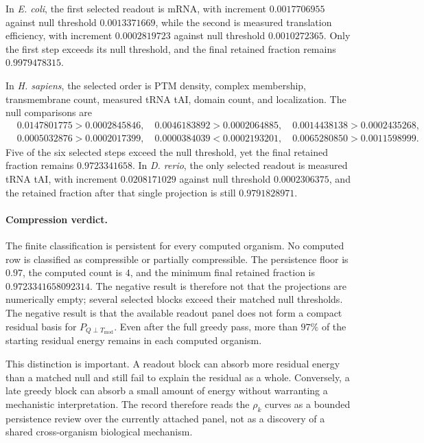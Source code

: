 In \emph{E. coli}, the first selected readout is mRNA, with increment $0.0017706955$ against null threshold $0.0013371669$, while the second is measured translation efficiency, with increment $0.0002819723$ against null threshold $0.0010272365$.  Only the first step exceeds its null threshold, and the final retained fraction remains $0.9979478315$.

In \emph{H. sapiens}, the selected order is PTM density, complex membership, transmembrane count, measured tRNA tAI, domain count, and localization.  The null comparisons are
$$
\begin{aligned}
&0.0147801775>0.0002845846,\quad
0.0046183892>0.0002064885,\quad
0.0014438138>0.0002435268,\\
&0.0005032876>0.0002017399,\quad
0.0000384039<0.0002193201,\quad
0.0065280850>0.0011598999.
\end{aligned}
$$
Five of the six selected steps exceed the null threshold, yet the final retained fraction remains $0.9723341658$.  In \emph{D. rerio}, the only selected readout is measured tRNA tAI, with increment $0.0208171029$ against null threshold $0.0002306375$, and the retained fraction after that single projection is still $0.9791828971$.

\paragraph{Compression verdict.}
The finite classification is persistent for every computed organism.  No computed row is classified as compressible or partially compressible.  The persistence floor is $0.97$, the computed count is $4$, and the minimum final retained fraction is $0.9723341658092314$.  The negative result is therefore not that the projections are numerically empty; several selected blocks exceed their matched null thresholds.  The negative result is that the available readout panel does not form a compact residual basis for $P_{Q\perp T_{\mathrm{mod}}}$.  Even after the full greedy pass, more than $97\%$ of the starting residual energy remains in each computed organism.

This distinction is important.  A readout block can absorb more residual energy than a matched null and still fail to explain the residual as a whole.  Conversely, a late greedy block can absorb a small amount of energy without warranting a mechanistic interpretation.  The record therefore reads the $\rho_k$ curves as a bounded persistence review over the currently attached panel, not as a discovery of a shared cross-organism biological mechanism.

